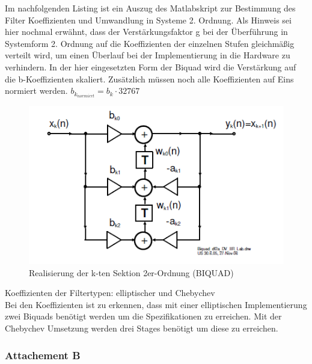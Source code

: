 \noindent Im nachfolgenden Listing ist ein Auszug des Matlabskript zur Bestimmung des Filter Koeffizienten und Umwandlung in Systeme 2. Ordnung. Als Hinweis sei hier nochmal erwähnt, dass der Verstärkungsfaktor g bei der Überführung in Systemform 2. Ordnung auf die Koeffizienten der einzelnen Stufen gleichmäßig verteilt wird, um einen Überlauf bei der Implementierung in die Hardware zu verhindern. In der hier eingesetzten Form der Biquad wird die Verstärkung auf die b-Koeffizienten skaliert. Zusätzlich müssen noch alle Koeffizienten auf Eins normiert werden. $b_{k_{normiert}} = b_{k} \cdot 32767$\\

\begin{figure}[h]
\centering
\includegraphics[width=0.7\linewidth]{Bilder/BIQUAD}
\caption{ Realisierung der k-ten Sektion 2er-Ordnung (BIQUAD)}
\label{fig:BIQUAD}
\end{figure}

\newpage



\noindent Koeffizienten der Filtertypen: elliptischer und Chebychev\\
Bei den Koeffizienten ist zu erkennen, dass mit einer elliptischen Implementierung zwei Biquads benötigt werden um die Spezifikationen zu erreichen. Mit der Chebychev Umsetzung werden drei Stages benötigt um diese zu erreichen.\\








\newpage
\subsubsection{Attachement B}

